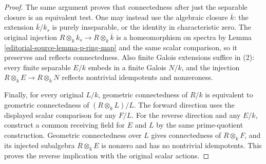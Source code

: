 \begin{proof}
The same argument proves that
connectedness after just the
separable closure is an equivalent
test. One may instead use the
algebraic closure $\overline k$:
the extension $\overline k/k_s$
is purely inseparable, or the
identity in characteristic zero.
The original injection
$R\otimes_k k_s\to R\otimes_k\overline k$
is a homeomorphism on spectra
by Lemma \ref{editorial-source-lemma-p-ring-map}
and the same scalar comparison,
so it preserves and reflects
connectedness. Also finite Galois
extensions suffice in (2): every
finite separable $E/k$ embeds
in a finite Galois $N/k$, and
the injection $R\otimes_k E\to R\otimes_k N$
reflects nontrivial idempotents
and nonzeroness.

Finally, for every original $L/k$,
geometric connectedness of $R/k$
is equivalent to geometric
connectedness of $(R\otimes_k L)/L$.
The forward direction uses
the displayed scalar comparison
for any $F/L$. For the reverse
direction and any $E/k$, construct
a common receiving field for
$E$ and $L$ by the same
prime-quotient construction.
Geometric connectedness over
$L$ gives connectedness of
$R\otimes_k F$, and its
injected subalgebra $R\otimes_k E$
is nonzero and has no nontrivial
idempotents. This proves the
reverse implication with the
original scalar actions.
\end{proof}